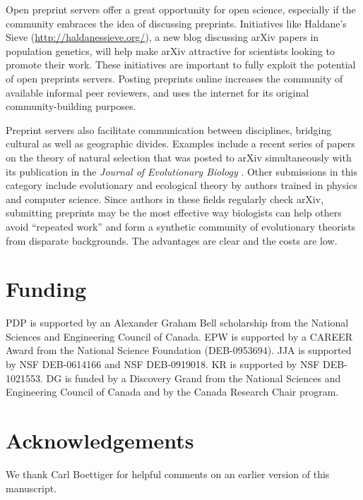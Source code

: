 \documentclass[letterpaper,twocolumn,superscriptaddress,showkeys,longbibliography]{revtex4-1}
\begin{document}

Open preprint servers offer a great opportunity for open science, especially if
the community embraces the idea of discussing preprints. Initiatives like
Haldane's Sieve (\href{http://haldanessieve.org/}{http://haldanessieve.org/}), a
new blog discussing arXiv papers in population genetics, will help make arXiv
attractive for scientists looking to promote their work. These initiatives are
important to fully exploit the potential of open preprints servers. Posting
preprints online increases the community of available informal peer reviewers,
and uses the internet for its original community-building purposes.

Preprint servers also facilitate communication between disciplines, bridging
cultural as well as geographic divides. Examples include a recent series of
papers on the theory of natural selection that was posted to arXiv
simultaneously with its publication in the \emph{Journal of Evolutionary
Biology} \cite{JEB:JEB2431,JEB:JEB2498,JEB:JEB2378,JEB:JEB2373}. Other
submissions in this category include evolutionary and ecological theory by
authors trained in physics and computer science.  Since authors in these fields
regularly check arXiv, submitting preprints may be the most effective way
biologists can help others avoid ``repeated work'' \cite{de2011contribution} and
form a synthetic community of evolutionary theorists from disparate backgrounds.
The advantages are clear and the costs are low.

\section{Funding}

PDP is supported by an Alexander Graham Bell scholarship from the National
Sciences and Engineering Council of Canada. EPW is supported by a CAREER Award
from the National Science Foundation (DEB-0953694). JJA is supported by NSF
DEB-0614166 and NSF DEB-0919018. KR is supported by NSF DEB-1021553. DG is
funded by a Discovery Grand from the National Sciences and Engineering Council
of Canada and by the Canada Research Chair program.

\section{Acknowledgements}

We thank Carl Boettiger for helpful comments on an earlier version of this
manuscript.

\newpage

\end{document}
